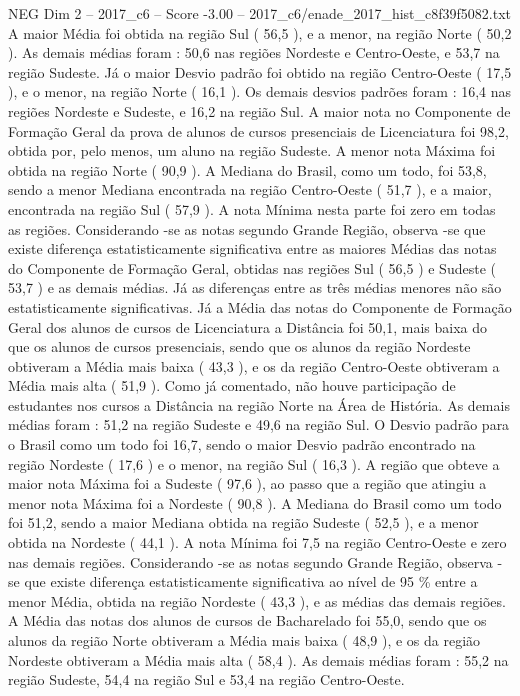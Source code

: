 \begin{textsample}{NEG Dim 2 – 2017\_c6 – Score -3.00 – 2017\_c6/enade\_2017\_hist\_c8f39f5082.txt}
A maior Média foi obtida na região Sul ( 56,5 ), e a menor, na região Norte ( 50,2 ).
As demais médias foram : 50,6 nas regiões Nordeste e Centro-Oeste, e 53,7 na região Sudeste.
Já o maior Desvio padrão foi obtido na região Centro-Oeste ( 17,5 ), e o menor, na região Norte ( 16,1 ).
Os demais desvios padrões foram : 16,4 nas regiões Nordeste e Sudeste, e 16,2 na região Sul.
A maior nota no Componente de Formação Geral da prova de alunos de cursos presenciais de Licenciatura foi 98,2, obtida por, pelo menos, um aluno na região Sudeste.
A menor nota Máxima foi obtida na região Norte ( 90,9 ).
A Mediana do Brasil, como um todo, foi 53,8, sendo a menor Mediana encontrada na região Centro-Oeste ( 51,7 ), e a maior, encontrada na região Sul ( 57,9 ).
A nota Mínima nesta parte foi zero em todas as regiões.
Considerando -se as notas segundo Grande Região, observa -se que existe diferença estatisticamente significativa entre as maiores Médias das notas do Componente de Formação Geral, obtidas nas regiões Sul ( 56,5 ) e Sudeste ( 53,7 ) e as demais médias.
Já as diferenças entre as três médias menores não são estatisticamente significativas.
Já a Média das notas do Componente de Formação Geral dos alunos de cursos de Licenciatura a Distância foi 50,1, mais baixa do que os alunos de cursos presenciais, sendo que os alunos da região Nordeste obtiveram a Média mais baixa ( 43,3 ), e os da região Centro-Oeste obtiveram a Média mais alta ( 51,9 ).
Como já comentado, não houve participação de estudantes nos cursos a Distância na região Norte na Área de História.
As demais médias foram : 51,2 na região Sudeste e 49,6 na região Sul.
O Desvio padrão para o Brasil como um todo foi 16,7, sendo o maior Desvio padrão encontrado na região Nordeste ( 17,6 ) e o menor, na região Sul ( 16,3 ).
A região que obteve a maior nota Máxima foi a Sudeste ( 97,6 ), ao passo que a região que atingiu a menor nota Máxima foi a Nordeste ( 90,8 ).
A Mediana do Brasil como um todo foi 51,2, sendo a maior Mediana obtida na região Sudeste ( 52,5 ), e a menor obtida na Nordeste ( 44,1 ).
A nota Mínima foi 7,5 na região Centro-Oeste e zero nas demais regiões.
Considerando -se as notas segundo Grande Região, observa -se que existe diferença estatisticamente significativa ao nível de 95 \% entre a menor Média, obtida na região Nordeste ( 43,3 ), e as médias das demais regiões.
A Média das notas dos alunos de cursos de Bacharelado foi 55,0, sendo que os alunos da região Norte obtiveram a Média mais baixa ( 48,9 ), e os da região Nordeste obtiveram a Média mais alta ( 58,4 ).
As demais médias foram : 55,2 na região Sudeste, 54,4 na região Sul e 53,4 na região Centro-Oeste.

\end{textsample}
